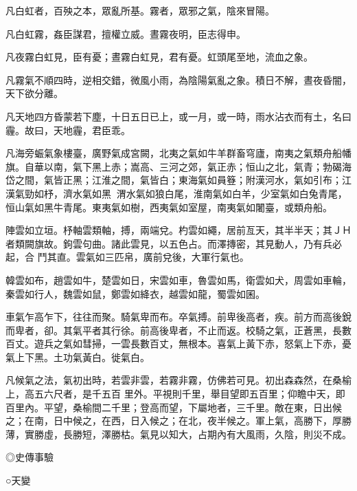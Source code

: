 \begin{pinyinscope}
 凡白虹者，百殃之本，眾亂所基。霧者，眾邪之氣，陰來冒陽。



 凡白虹霧，姦臣謀君，擅權立威。晝霧夜明，臣志得申。



 凡夜霧白虹見，臣有憂；晝霧白虹見，君有憂。虹頭尾至地，流血之象。



 凡霧氣不順四時，逆相交錯，微風小雨，為陰陽氣亂之象。積日不解，晝夜昏闇，天下欲分離。



 凡天地四方昏蒙若下塵，十日五日已上，或一月，或一時，雨水沾衣而有土，名曰霾。故曰，天地霾，君臣乖。



 凡海旁蜄氣象樓臺，廣野氣成宮闕，北夷之氣如牛羊群畜穹廬，南夷之氣類舟船幡旗。自華以南，氣下黑上赤；嵩高、三河之郊，氣正赤；恒山之北，氣青；勃碣海岱之間，氣皆正黑；江淮之間，氣皆白；東海氣如員簦；附漢河水，氣如引布；江漢氣勁如杼，濟水氣如黑，渭水氣如狼白尾，淮南氣如白羊，少室氣如白兔青尾，恒山氣如黑牛青尾。東夷氣如樹，西夷氣如室屋，南夷氣如闍臺，或類舟船。



 陣雲如立垣。杼軸雲類軸，搏，兩端兌。杓雲如繩，居前亙天，其半半天；其ＪＨ者類闕旗故。鉤雲句曲。諸此雲見，以五色占。而澤摶密，其見動人，乃有兵必起，合
 鬥其直。雲氣如三匹帛，廣前兌後，大軍行氣也。



 韓雲如布，趙雲如牛，楚雲如日，宋雲如車，魯雲如馬，衛雲如犬，周雲如車輪，秦雲如行人，魏雲如鼠，鄭雲如絳衣，越雲如龍，蜀雲如囷。



 車氣乍高乍下，往往而聚。騎氣卑而布。卒氣搏。前卑後高者，疾。前方而高後銳而卑者，卻。其氣平者其行徐。前高後卑者，不止而返。校騎之氣，正蒼黑，長數百丈。遊兵之氣如彗掃，一雲長數百丈，無根本。喜氣上黃下赤，怒氣上下赤，憂氣上下黑。土功氣黃白。徙氣白。



 凡候氣之法，氣初出時，若雲非雲，若霧非霧，仿佛若可見。初出森森然，在桑榆上，高五六尺者，是千五百
 里外。平視則千里，舉目望即五百里；仰瞻中天，即百里內。平望，桑榆間二千里；登高而望，下屬地者，三千里。敵在東，日出候之；在南，日中候之，在西，日入候之；在北，夜半候之。軍上氣，高勝下，厚勝薄，實勝虛，長勝短，澤勝枯。氣見以知大，占期內有大風雨，久陰，則災不成。



 ◎史傳事驗



 ○天變




\end{pinyinscope}
